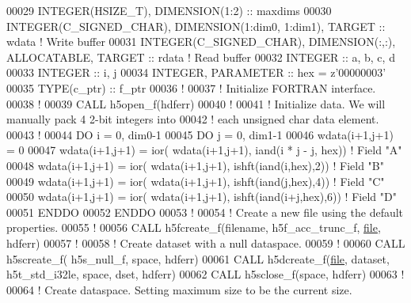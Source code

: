 \begin{DoxyCode}
00029   \textcolor{keywordtype}{INTEGER(HSIZE\_T)}, \textcolor{keywordtype}{DIMENSION(1:2)}   :: maxdims
00030   \textcolor{keywordtype}{INTEGER(C\_SIGNED\_CHAR)}, \textcolor{keywordtype}{DIMENSION(1:dim0, 1:dim1)}, \textcolor{keywordtype}{TARGET} :: wdata              \textcolor{comment}{! Write buffer }
00031   \textcolor{keywordtype}{INTEGER(C\_SIGNED\_CHAR)}, \textcolor{keywordtype}{DIMENSION(:,:)}, \textcolor{keywordtype}{ALLOCATABLE}, \textcolor{keywordtype}{TARGET} :: rdata    \textcolor{comment}{! Read buffer}
00032   \textcolor{keywordtype}{INTEGER} :: a, b, c, d
00033   \textcolor{keywordtype}{INTEGER} :: i, j
00034   \textcolor{keywordtype}{INTEGER}, \textcolor{keywordtype}{PARAMETER} :: hex =  z\textcolor{stringliteral}{'00000003'}
00035   \textcolor{keywordtype}{TYPE}(c\_ptr) :: f\_ptr
00036   \textcolor{comment}{!}
00037   \textcolor{comment}{! Initialize FORTRAN interface.}
00038   \textcolor{comment}{!}
00039   \textcolor{keyword}{CALL }h5open\_f(hdferr)
00040   \textcolor{comment}{!}
00041   \textcolor{comment}{! Initialize data.  We will manually pack 4 2-bit integers into}
00042   \textcolor{comment}{! each unsigned char data element.}
00043   \textcolor{comment}{!}
00044   \textcolor{keywordflow}{DO} i = 0, dim0-1
00045      \textcolor{keywordflow}{DO} j = 0, dim1-1
00046         wdata(i+1,j+1) = 0
00047         wdata(i+1,j+1) = ior( wdata(i+1,j+1), iand(i * j - j, hex))   \textcolor{comment}{! Field "A"}
00048         wdata(i+1,j+1) = ior( wdata(i+1,j+1), ishft(iand(i,hex),2))   \textcolor{comment}{! Field "B"}
00049         wdata(i+1,j+1) = ior( wdata(i+1,j+1), ishft(iand(j,hex),4))   \textcolor{comment}{! Field "C"}
00050         wdata(i+1,j+1) = ior( wdata(i+1,j+1), ishft(iand(i+j,hex),6)) \textcolor{comment}{! Field "D"}
00051 \textcolor{keywordflow}{     ENDDO}
00052 \textcolor{keywordflow}{  ENDDO}
00053   \textcolor{comment}{!}
00054   \textcolor{comment}{! Create a new file using the default properties.}
00055   \textcolor{comment}{!}
00056   \textcolor{keyword}{CALL }h5fcreate\_f(filename, h5f\_acc\_trunc\_f, \hyperlink{structfile}{file}, hdferr)
00057   \textcolor{comment}{!}
00058   \textcolor{comment}{! Create dataset with a null dataspace.}
00059   \textcolor{comment}{!}
00060   \textcolor{keyword}{CALL }h5screate\_f( h5s\_null\_f, space, hdferr)
00061   \textcolor{keyword}{CALL }h5dcreate\_f(\hyperlink{structfile}{file}, dataset, h5t\_std\_i32le, space, dset, hdferr)
00062   \textcolor{keyword}{CALL }h5sclose\_f(space, hdferr)
00063   \textcolor{comment}{!}
00064   \textcolor{comment}{! Create dataspace.  Setting maximum size to be the current size.}

\end{DoxyCode}
